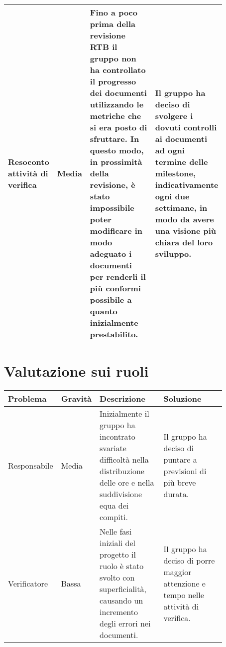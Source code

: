 \begin{center}
\begin{longtable}{|p{0.16\linewidth}|p{0.11\linewidth}|p{0.3\linewidth}|p{0.3\linewidth}|}
    \rowcolor[HTML]{C0C0C0}
    Resoconto attività di verifica & Media & Fino a poco prima della revisione RTB il gruppo non ha controllato il progresso dei documenti utilizzando le metriche che si era posto di sfruttare. In questo modo, in prossimità della revisione, è stato impossibile poter modificare in modo adeguato i documenti per renderli il più conformi possibile a quanto inizialmente prestabilito. & Il gruppo ha deciso di svolgere i dovuti controlli ai documenti ad ogni termine delle milestone, indicativamente ogni due settimane, in modo da avere una visione più chiara del loro sviluppo.\\ \hline
    \hline
    \end{longtable}
\end{center}

\section{Valutazione sui ruoli}
\begin{center}
    \renewcommand{\arraystretch}{1.25}
\begin{table}[H]
    \centering
    \begin{longtable}{|p{0.16\linewidth}|p{0.11\linewidth}|p{0.3\linewidth}|p{0.3\linewidth}|}
   \hline
    \rowcolor[HTML]{036400}
    {\color[HTML]{EFEFEF} \textbf{Problema}} & {\color[HTML]{EFEFEF} \textbf{Gravità}} & {\color[HTML]{EFEFEF} \textbf{Descrizione}} & {\color[HTML]{EFEFEF} \textbf{Soluzione}} \\ \hline
    \rowcolor[HTML]{EFEFEF}
    Responsabile & Media & Inizialmente il gruppo ha incontrato svariate difficoltà nella distribuzione delle ore e nella suddivisione equa dei compiti. & Il gruppo ha deciso di puntare a previsioni di più breve durata. \\ \hline
    \rowcolor[HTML]{C0C0C0}
    Verificatore & Bassa & Nelle fasi iniziali del progetto il ruolo è stato svolto con superficialità, causando un incremento degli errori nei documenti. & Il gruppo ha deciso di porre maggior attenzione e tempo nelle attività di verifica. \\ \hline
    \end{longtable}
\end{table}
\end{center}


